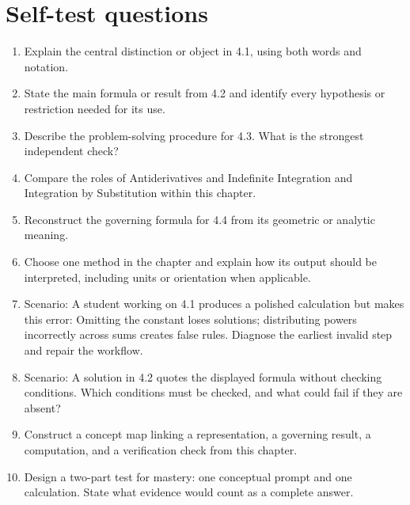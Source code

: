 \documentclass[11pt]{article}
\begin{document}
\section{Self-test questions}
\begin{enumerate}
\item Explain the central distinction or object in 4.1, using both words and notation.
\item State the main formula or result from 4.2 and identify every hypothesis or restriction needed for its use.
\item Describe the problem-solving procedure for 4.3. What is the strongest independent check?
\item Compare the roles of Antiderivatives and Indefinite Integration and Integration by Substitution within this chapter.
\item Reconstruct the governing formula for 4.4 from its geometric or analytic meaning.
\item Choose one method in the chapter and explain how its output should be interpreted, including units or orientation when applicable.
\item Scenario: A student working on 4.1 produces a polished calculation but makes this error: Omitting the constant loses solutions; distributing powers incorrectly across sums creates false rules. Diagnose the earliest invalid step and repair the workflow.
\item Scenario: A solution in 4.2 quotes the displayed formula without checking conditions. Which conditions must be checked, and what could fail if they are absent?
\item Construct a concept map linking a representation, a governing result, a computation, and a verification check from this chapter.
\item Design a two-part test for mastery: one conceptual prompt and one calculation. State what evidence would count as a complete answer.
\end{enumerate}

\end{document}
